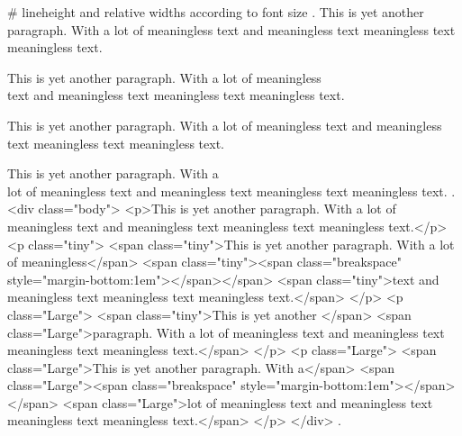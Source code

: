 #
lineheight and relative widths according to font size
.
This is yet another paragraph. With a lot of meaningless text and meaningless text meaningless text meaningless text.

\tiny This is yet another paragraph.  With a lot of meaningless\\[1em] text and meaningless text meaningless text meaningless text.

This is yet another \Large paragraph. With a lot of meaningless text and meaningless text meaningless text meaningless text.

This is yet another paragraph. With a\\[1em] lot of meaningless text and meaningless text meaningless text meaningless text.
.
<div class="body">
<p>This is yet another paragraph. With a lot of meaningless text and meaningless text meaningless text meaningless text.</p>
<p class="tiny">
<span class="tiny">This is yet another paragraph. With a lot of meaningless</span>
<span class="tiny"><span class="breakspace" style="margin-bottom:1em"></span></span>
<span class="tiny">text and meaningless text meaningless text meaningless text.</span>
</p>
<p class="Large">
<span class="tiny">This is yet another </span>
<span class="Large">paragraph. With a lot of meaningless text and meaningless text meaningless text meaningless text.</span>
</p>
<p class="Large">
<span class="Large">This is yet another paragraph. With a</span>
<span class="Large"><span class="breakspace" style="margin-bottom:1em"></span></span>
<span class="Large">lot of meaningless text and meaningless text meaningless text meaningless text.</span>
</p>
</div>
.
